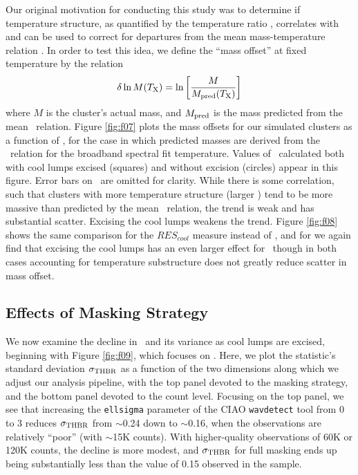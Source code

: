 \documentclass[12pt,preprint]{aastex}
\begin{document}
Our original motivation for conducting this study was to determine if
temperature structure, as quantified by the temperature ratio \thbr,
correlates with and can be used to correct for departures from the
mean mass-temperature relation \mtx.  In order to test this idea, we
define the ``mass offset'' at fixed temperature by the relation
\begin{equation}
  \delta \ln M (T_{\rm X}) = \ln \left[ \frac {M} {M_{\rm pred}(T_{\rm X})} \right]
  \label{eq:deltaM}
\end{equation}
where $M$ is the cluster's actual mass, and $M_{\rm pred}$ is the mass
predicted from the mean \mtx\ relation.  Figure \ref{fig:f07} plots
the mass offsets for our simulated clusters as a function of \thbr,
for the case in which predicted masses are derived from the \mtx\
relation for the broadband spectral fit temperature.  Values of \thbr\
calculated both with cool lumps excised (squares) and without excision
(circles) appear in this figure.  Error bars on \thbr\ are omitted for
clarity.  While there is some correlation, such that clusters with
more temperature structure (larger \thbr) tend to be more massive than
predicted by the mean \mtx\ relation, the trend is weak and has
substantial scatter.  Excising the cool lumps weakens the trend.
Figure \ref{fig:f08} shows the same comparison for the $RES_{cool}$
measure instead of \thbr, and for we again find that excising the cool
lumps has an even larger effect for \thbr\, though in both cases
accounting for temperature substructure does not greatly reduce
scatter in mass offset.


\subsection{Effects of Masking Strategy}
\label{sec:masking}

We now examine the decline in \thbr\ and its variance as cool lumps
are excised, beginning with Figure \ref{fig:f09}, which focuses on
\thbr.  Here, we plot the statistic's standard deviation $\sigma_{\rm
  THBR}$ as a function of the two dimensions along which we adjust our
analysis pipeline, with the top panel devoted to the masking strategy,
and the bottom panel devoted to the count level.  Focusing on the top
panel, we see that increasing the \verb|ellsigma| parameter of the
CIAO \verb|wavdetect| tool from 0 to 3 reduces $\sigma_{\rm THBR}$
from $\sim$0.24 down to $\sim$0.16, when the observations are
relatively ``poor'' (with $\sim$15K counts).  With higher-quality
observations of 60K or 120K counts, the decline is more modest, and $\sigma_{\rm THBR}$ for full masking ends up being substantially less than the value of 0.15 observed in the \cite{cavagnolo_bandpass_2008} sample.
\end{document}
